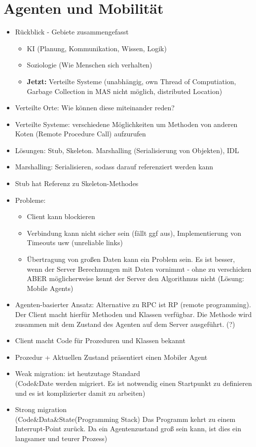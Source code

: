 \documentclass{article} %
\begin{document}
	\section{Agenten und Mobilität}	
	\begin{itemize}
		\item Rückblick - Gebiete zusammengefasst
			\begin{itemize}
			\item KI (Planung, Kommunikation, Wissen, Logik)
			\item Soziologie (Wie Menschen sich verhalten)
			\item \textbf{Jetzt:} Verteilte Systeme (unabhängig, own Thread of Computiation, Garbage Collection in MAS nicht möglich, distributed Location)
			\end{itemize}			
		\item Verteilte Orte: Wie können diese miteinander reden?
		\item Verteilte Systeme: verschiedene Möglichkeiten um Methoden von anderen Koten (Remote Procedure Call) aufzurufen
		\item Lösungen: Stub, Skeleton. Marshalling (Serialisierung von Objekten), IDL
		\item Marshalling: Serialisieren, sodass darauf referenziert werden kann
		\item Stub hat Referenz zu Skeleton-Methodes
		\item Probleme: 
		\begin{itemize}
			\item Client kann blockieren
			\item Verbindung kann nicht sicher sein (fällt ggf aus), Implementierung von Timeouts usw (unreliable links)
			\item Übertragung von großen Daten kann ein Problem sein. Es ist besser, wenn der Server Berechnungen mit Daten vornimmt - ohne zu verschicken ABER möglicherweise kennt der Server den Algorithmus nicht (Lösung: Mobile Agents)
		\end{itemize}
		\item Agenten-basierter Ansatz: Alternative zu RPC ist RP (remote programming). Der Client macht hierfür Methoden und Klassen verfügbar. Die Methode wird zusammen mit dem Zustand des Agenten auf dem Server ausgeführt. (?)
		\item Client macht Code für Prozeduren und Klassen bekannt
		\item Prozedur + Aktuellen Zustand präsentiert einen Mobiler Agent
		\item Weak migration: ist heutzutage Standard\\
		(Code\&Date werden migriert. Es ist notwendig einen Startpunkt zu definieren und es ist komplizierter damit zu arbeiten)
		\item Strong migration\\
		(Code\&Data\&State(Programming Stack) Das Programm kehrt zu einem Interrupt-Point zurück. Da ein Agentenzustand groß sein kann, ist dies ein langsamer und teurer Prozess)
	

\end{itemize}
\end{document}
